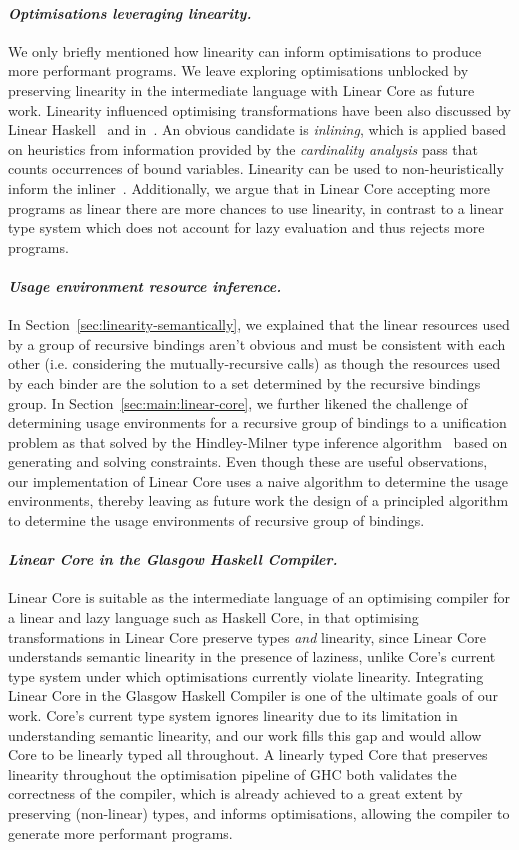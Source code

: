 \documentclass[acmsmall, screen, review]{acmart}
\newcommand{\parawith}[1]{\paragraph{\emph{#1}}}
\begin{document}


\parawith{Optimisations leveraging linearity.}
We only briefly mentioned how linearity can inform optimisations to produce
more performant programs. We leave exploring optimisations unblocked by
preserving linearity in the intermediate language with Linear Core as future
work. Linearity influenced optimising transformations have been also discussed
by Linear Haskell~\cite{cite:linearhaskell} and
in~\cite{cite:let-floating,peytonjones1997a}. An obvious candidate is
\emph{inlining}, which is applied based on heuristics from information provided
by the \emph{cardinality analysis} pass that counts occurrences of bound
variables.  Linearity can be used to non-heuristically inform
the inliner~\cite{cite:linearhaskell}. Additionally, we argue that in Linear
Core accepting more programs as linear there are more chances to use linearity,
in contrast to a linear type system which does not account for lazy evaluation
and thus rejects more programs.

\parawith{Usage environment resource inference.}
In Section~\ref{sec:linearity-semantically}, we explained that the linear
resources used by a group of recursive bindings aren't obvious and must be
consistent with each other (i.e. considering the mutually-recursive calls) as
though the resources used by each binder are the solution to a set determined
by the recursive bindings group.  In Section~\ref{sec:main:linear-core}, we
further likened the challenge of determining usage environments for a recursive
group of bindings to a unification problem as that solved by the Hindley-Milner
type inference algorithm~\cite{DBLP:conf/popl/DamasM82} based on generating and solving
constraints. Even though these are useful observations, our implementation of
Linear Core uses a naive algorithm to determine the usage environments, thereby
leaving as future work the design of a principled algorithm to determine the
usage environments of recursive group of bindings.

\parawith{Linear Core in the Glasgow Haskell Compiler.}
Linear Core is suitable as the intermediate language of an optimising compiler
for a linear and lazy language such as Haskell Core, in that optimising
transformations in Linear Core preserve types \emph{and} linearity, since Linear
Core understands semantic linearity in the presence of laziness, unlike
Core's current type system under which optimisations currently violate
linearity.
%
Integrating Linear Core in the Glasgow Haskell Compiler is one of the ultimate
goals of our work. Core's current type system ignores linearity due to
its limitation in understanding semantic linearity, and our work fills this gap
and would allow Core to be linearly typed all throughout.
%
A linearly typed Core that preserves linearity throughout the optimisation
pipeline of GHC both validates the correctness of the compiler, which is
already achieved to a great extent by preserving (non-linear) types, and
informs optimisations, allowing the compiler to generate more performant programs.
\end{document}
